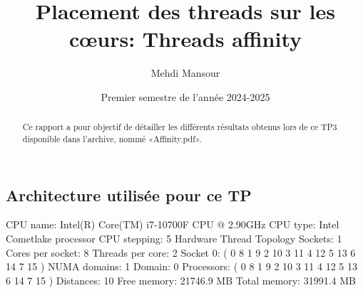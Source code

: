 \documentclass{rapport}
\title{Placement des threads sur les cœurs: Threads affinity}
\author{Mehdi Mansour}
\date{Premier semestre de l'année 2024-2025}
\begin{document}
  \maketitle

  \begin{abstract}
    Ce rapport a pour objectif de détailler les différents résultats obtenus lors de ce TP3 disponible dans l'archive, nommé «Affinity.pdf».
     \end{abstract}
\subsection*{Architecture utilisée pour ce TP}
     \noindent
    CPU name:	Intel(R) Core(TM) i7-10700F CPU @ 2.90GHz
    \newline
    CPU type:	Intel Cometlake processor
    \newline
    CPU stepping:	5
    \newline
    \newline
    \noindent
    Hardware Thread Topology
    \newline
    \newline
    Sockets:		1
    \newline
    Cores per socket:	8
    \newline
    Threads per core:	2
    \newline
    Socket 0:		( 0 8 1 9 2 10 3 11 4 12 5 13 6 14 7 15 )
    \newline
    \newline
    NUMA domains:		1
    \newline
    Domain:			0
    \newline
    Processors:		( 0 8 1 9 2 10 3 11 4 12 5 13 6 14 7 15 )
    \newline
    Distances:		10
    \newline
    Free memory:		21746.9 MB
    \newline
    Total memory:		31991.4 MB
    \newline
\end{document}

